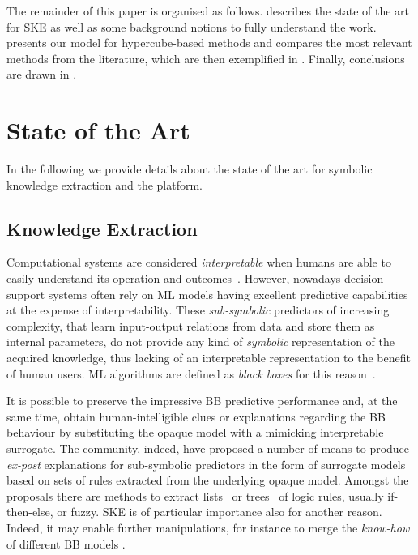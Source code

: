 \documentclass[
]{ceurart}
\begin{document}
The remainder of this paper is organised as follows.
%
 describes the state of the art for SKE as well as some background notions to fully understand the work.
%
 presents our model for hypercube-based methods and compares the most relevant methods from the literature, which are then exemplified in .
%
Finally, conclusions are drawn in .

\section{State of the Art}\label{sec:state}

In the following we provide details about the state of the art for symbolic knowledge extraction and the \psyke{} platform.

\subsection{Knowledge Extraction}\label{ssec:extraction}

Computational systems are considered \emph{interpretable} when humans are able to easily understand its operation and outcomes~\cite{agentbasedxai-aamas2020}.
%
However, nowadays decision support systems often rely on ML models having excellent predictive capabilities at the expense of interpretability.
%
These \emph{sub-symbolic} predictors of increasing complexity, that learn input-output relations from data and store them as internal parameters, do not provide any kind of \emph{symbolic} representation of the acquired knowledge, thus lacking of an interpretable representation to the benefit of human users.
%
ML algorithms are defined as \emph{black boxes} for this reason~\cite{Lipton2018}.

It is possible to preserve the impressive BB predictive performance and, at the same time, obtain human-intelligible clues or explanations regarding the BB behaviour by substituting the opaque model with a mimicking interpretable surrogate.
%
The \xai{} community, indeed, have proposed a number of means to produce \emph{ex-post} explanations for sub-symbolic predictors in the form of surrogate models based on sets of rules extracted from the underlying opaque model.
%
Amongst the proposals there are methods to extract lists~\cite{craven1994using,huysmans2006iter,gridex-extraamas2021} or trees~\cite{craven1996extracting,breiman1984classification} of logic rules, usually if-then-else, \mofn{} or fuzzy.
%
SKE is of particular importance also for another reason.
%
Indeed, it may enable further manipulations, for instance to merge the \emph{know-how} of different BB models \cite{xmas-aiiot2019}.
\end{document}
